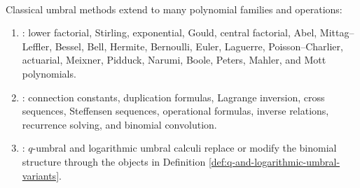 \begin{remark} \label{rem:umbral-calculus-further-directions} \\
Classical umbral methods extend to many polynomial families and operations:
\begin{enumerate}[label=(\roman*)]
\setlength{\itemsep}{0pt}
\item {}: lower factorial, Stirling, exponential, Gould, central
factorial, Abel, Mittag--Leffler, Bessel, Bell, Hermite, Bernoulli, Euler,
Laguerre, Poisson--Charlier, actuarial, Meixner, Pidduck, Narumi, Boole,
Peters, Mahler, and Mott polynomials.
\item {}: connection constants, duplication formulas, Lagrange
inversion, cross sequences, Steffensen sequences, operational formulas,
inverse relations, recurrence solving, and binomial convolution.
\item {}: $q$-umbral and logarithmic umbral calculi replace or
modify the binomial structure through the objects in Definition
\ref{def:q-and-logarithmic-umbral-variants}.
\end{enumerate}
\end{remark}
